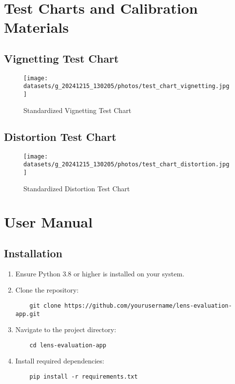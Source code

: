 
\chapter{Test Charts and Calibration Materials}
\label{app:test_charts}

\section{Vignetting Test Chart}
\label{app:vignetting_chart}
\begin{figure}[H]
    \centering
    \texttt{[image: datasets/g\_20241215\_130205/photos/test\_chart\_vignetting.jpg]}
    \caption{Standardized Vignetting Test Chart}
    \label{fig:vignetting_chart}
\end{figure}

\section{Distortion Test Chart}
\label{app:distortion_chart}
\begin{figure}[H]
    \centering
    \texttt{[image: datasets/g\_20241215\_130205/photos/test\_chart\_distortion.jpg]}
    \caption{Standardized Distortion Test Chart}
    \label{fig:distortion_chart}
\end{figure}


\chapter{User Manual}
\label{app:user_manual}

\section{Installation}
\begin{enumerate}
    \item Ensure Python 3.8 or higher is installed on your system.
    \item Clone the repository:
    \begin{verbatim}
    git clone https://github.com/yourusername/lens-evaluation-app.git
    \end{verbatim}
    \item Navigate to the project directory:
    \begin{verbatim}
    cd lens-evaluation-app
    \end{verbatim}
    \item Install required dependencies:
    \begin{verbatim}
    pip install -r requirements.txt
    \end{verbatim}
\end{enumerate}

